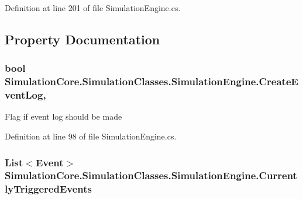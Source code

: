Definition at line 201 of file Simulation\+Engine.\+cs.



\subsection{Property Documentation}
\subsubsection[{\texorpdfstring{Create\+Event\+Log}{CreateEventLog}}]{\setlength{\rightskip}{0pt plus 5cm}bool Simulation\+Core.\+Simulation\+Classes.\+Simulation\+Engine.\+Create\+Event\+Log\hspace{0.3cm}{\ttfamily [get]}, {\ttfamily [set]}}\hypertarget{class_simulation_core_1_1_simulation_classes_1_1_simulation_engine_a332221c578adb68a541d03f20ffe9b44}{}\label{class_simulation_core_1_1_simulation_classes_1_1_simulation_engine_a332221c578adb68a541d03f20ffe9b44}


Flag if event log should be made 



Definition at line 98 of file Simulation\+Engine.\+cs.

\subsubsection[{\texorpdfstring{Currently\+Triggered\+Events}{CurrentlyTriggeredEvents}}]{\setlength{\rightskip}{0pt plus 5cm}List$<${\bf Event}$>$ Simulation\+Core.\+Simulation\+Classes.\+Simulation\+Engine.\+Currently\+Triggered\+Events\hspace{0.3cm}{\ttfamily [get]}}\hypertarget{class_simulation_core_1_1_simulation_classes_1_1_simulation_engine_ab47538ac861f1173cb50f5546d3d7d52}{}\label{class_simulation_core_1_1_simulation_classes_1_1_simulation_engine_ab47538ac861f1173cb50f5546d3d7d52}


